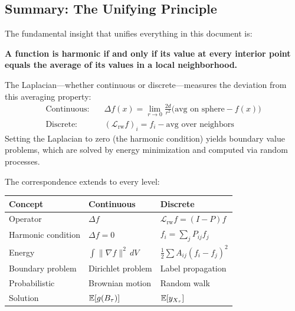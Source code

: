 \begin{notechapter}
\section{Summary: The Unifying Principle}
\label{harmonic-functions:sec:summary}

The fundamental insight that unifies everything in this document is:

\begin{intuitionbox}[title=The Unifying Principle]
\textbf{A function is harmonic if and only if its value at every interior
point equals the average of its values in a local neighborhood.}

The Laplacian---whether continuous or discrete---measures the deviation
from this averaging property:
\begin{align}
\text{Continuous:}\quad & \Delta f(x)
  = \lim_{r \to 0} \frac{2d}{r^2}
    \bigl(\text{avg on sphere} - f(x)\bigr) \\
\text{Discrete:}\quad & (\mathcal{L}_{\mathrm{rw}} f)_i
  = f_i - \text{avg over neighbors}
\end{align}
Setting the Laplacian to zero (the harmonic condition) yields boundary value
problems, which are solved by energy minimization and computed via random
processes.
\end{intuitionbox}

The correspondence extends to every level:

\begin{center}
\begin{tabular}{lll}
\toprule
\textbf{Concept} & \textbf{Continuous} & \textbf{Discrete} \\
\midrule
Operator & $\Delta f$ & $\mathcal{L}_{\mathrm{rw}} f = (I - P)f$ \\
Harmonic condition & $\Delta f = 0$ &
  $f_i = \sum_j P_{ij}f_j$ \\
Energy & $\int \|\nabla f\|^2\,dV$ &
  $\frac{1}{2}\sum A_{ij}(f_i - f_j)^2$ \\
Boundary problem & Dirichlet problem & Label propagation \\
Probabilistic & Brownian motion & Random walk \\
Solution & $\mathbb{E}[g(B_\tau)]$ & $\mathbb{E}[y_{X_\tau}]$ \\
\bottomrule
\end{tabular}
\end{center}


\end{notechapter}
